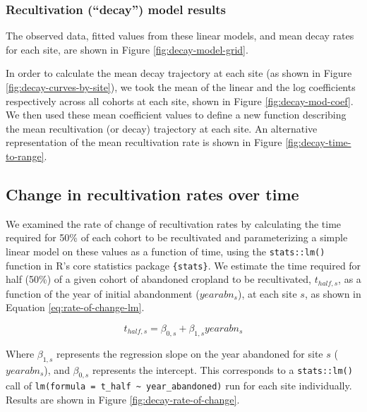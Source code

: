 \documentclass[9pt,twocolumn,twoside,lineno]{pnas-new}
\begin{document}
\hypertarget{recultivation-decay-model-results}{%
\subsubsection{Recultivation (``decay'') model results}\label{recultivation-decay-model-results}}

The observed data, fitted values from these linear models, and mean decay rates for each site, are shown in Figure \ref{fig:decay-model-grid}.

In order to calculate the mean decay trajectory at each site (as shown in Figure \ref{fig:decay-curves-by-site}), we took the mean of the linear and the log coefficients respectively across all cohorts at each site, shown in Figure \ref{fig:decay-mod-coef}.
We then used these mean coefficient values to define a new function describing the mean recultivation (or decay) trajectory at each site.
An alternative representation of the mean recultivation rate is shown in Figure \ref{fig:decay-time-to-range}.

\hypertarget{section-methods-rate-of-change}{%
\subsection{Change in recultivation rates over time}\label{section-methods-rate-of-change}}

We examined the rate of change of recultivation rates by calculating the time required for 50\% of each cohort to be recultivated and parameterizing a simple linear model on these values as a function of time, using the \texttt{stats::lm()} function in R's core statistics package \texttt{\{stats\}}.
We estimate the time required for half (50\%) of a given cohort of abandoned cropland to be recultivated, \(t_{half,s}\), as a function of the year of initial abandonment (\(yearabn_{s}\)), at each site \(s\), as shown in Equation \eqref{eq:rate-of-change-lm}.

\begin{equation}
t_{half,s} = \beta_{0,s} + \beta_{1,s} yearabn_{s} \label{eq:rate-of-change-lm}
\end{equation}

Where \(\beta_{1,s}\) represents the regression slope on the year abandoned for site \(s\) (\(yearabn_{s}\)), and \(\beta_{0,s}\) represents the intercept.
This corresponds to a \texttt{stats::lm()} call of \texttt{lm(formula\ =\ t\_half\ \textasciitilde{}\ year\_abandoned)} run for each site individually.
Results are shown in Figure \ref{fig:decay-rate-of-change}.
\end{document}
